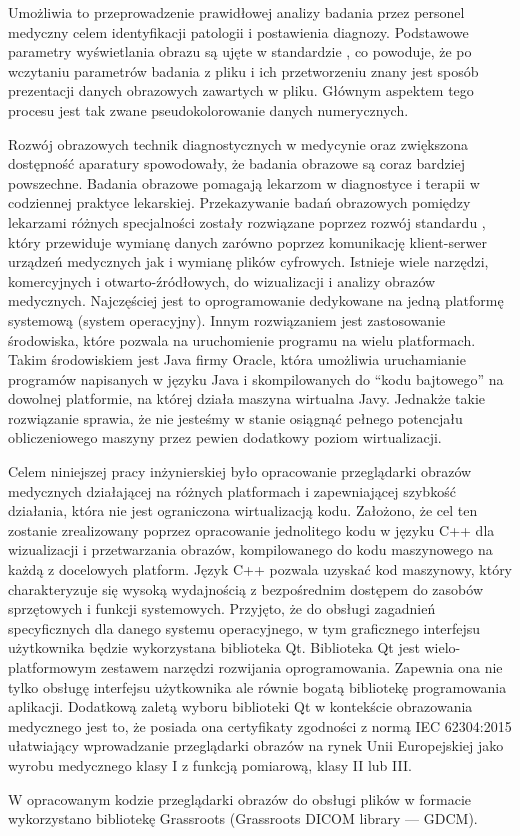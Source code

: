 Umożliwia to przeprowadzenie prawidłowej analizy badania przez personel medyczny celem identyfikacji patologii i postawienia diagnozy.
Podstawowe parametry wyświetlania obrazu są ujęte w standardzie \DICOM, co powoduje, że po wczytaniu parametrów badania z pliku i ich przetworzeniu znany jest sposób prezentacji danych obrazowych zawartych w pliku.
Głównym aspektem tego procesu jest tak zwane pseudokolorowanie danych numerycznych. 
\par
Rozwój obrazowych technik diagnostycznych w medycynie oraz zwiększona dostępność aparatury spowodowały, że badania obrazowe są coraz bardziej powszechne. Badania obrazowe pomagają lekarzom w diagnostyce i terapii w codziennej praktyce lekarskiej.
Przekazywanie badań obrazowych pomiędzy lekarzami różnych specjalności zostały rozwiązane poprzez rozwój standardu \DICOM, który przewiduje wymianę danych zarówno poprzez komunikację klient-serwer urządzeń medycznych jak i wymianę plików cyfrowych. 
Istnieje wiele narzędzi, komercyjnych i otwarto-źródłowych, do wizualizacji i analizy obrazów medycznych.
Najczęściej jest to oprogramowanie dedykowane na jedną platformę systemową (system operacyjny).  
Innym rozwiązaniem jest zastosowanie środowiska, które pozwala na uruchomienie programu na wielu platformach. Takim środowiskiem jest Java firmy Oracle, która umożliwia uruchamianie programów napisanych w języku Java i skompilowanych do \enquote{kodu bajtowego} na dowolnej platformie, na której działa maszyna wirtualna Javy. Jednakże takie rozwiązanie sprawia, że nie jesteśmy w stanie osiągnąć pełnego potencjału obliczeniowego maszyny przez pewien dodatkowy poziom wirtualizacji.
\par
Celem niniejszej pracy inżynierskiej było opracowanie przeglądarki obrazów medycznych działającej na różnych platformach i zapewniającej szybkość działania, która nie jest ograniczona wirtualizacją kodu.
Założono, że cel ten zostanie zrealizowany poprzez opracowanie jednolitego kodu w języku C++ dla wizualizacji i przetwarzania obrazów, kompilowanego do kodu maszynowego na każdą z docelowych platform.
Język C++ pozwala uzyskać kod maszynowy, który charakteryzuje się wysoką wydajnością z bezpośrednim dostępem do zasobów sprzętowych i funkcji systemowych.
Przyjęto, że do obsługi zagadnień specyficznych dla danego systemu operacyjnego, w tym graficznego interfejsu użytkownika będzie wykorzystana biblioteka Qt.
Biblioteka Qt jest wielo-platformowym zestawem narzędzi rozwijania oprogramowania.
Zapewnia ona nie tylko obsługę interfejsu użytkownika ale równie bogatą bibliotekę programowania aplikacji.
Dodatkową zaletą wyboru biblioteki Qt w kontekście obrazowania medycznego jest to, że posiada ona certyfikaty zgodności z normą IEC 62304:2015 ułatwiający wprowadzanie przeglądarki obrazów na rynek Unii Europejskiej jako wyrobu medycznego klasy I z funkcją pomiarową, klasy II lub III.  
\par
W opracowanym kodzie przeglądarki obrazów do obsługi plików w formacie \DICOM wykorzystano bibliotekę Grassroots (Grassroots DICOM library --- GDCM).